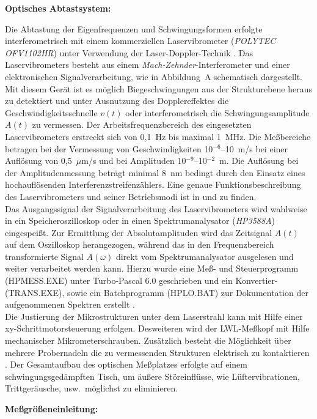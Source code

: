 {\bf Optisches Abtastsystem:}

Die Abtastung der Eigenfrequenzen und Schwingungsformen erfolgte
interferometrisch mit einem kommerziellen Laservibrometer
({\em POLYTEC OFV1102HR}) unter Verwendung der Laser-Doppler-Technik
\cite{Pol91}. Das Laservibrometers besteht aus einem
{\em Mach-Zehnder}-Interferometer und einer elektronischen
Signalverarbeitung, wie in Abbildung~A schematisch dargestellt.
Mit diesem Gerät ist es möglich Biegeschwingungen aus der Strukturebene
heraus zu detektiert und unter Ausnutzung des Dopplereffektes die
Geschwindigkeitsschnelle $v(t)$ oder interferometrisch die
Schwingungsamplitude $A(t)$ zu vermessen.
Der Arbeitsfrequenzbereich des eingesetzten Laservibrometers erstreckt
sich von 0,1~Hz bis maximal 1~MHz. Die Meßbereiche betragen bei der
Vermessung von Geschwindigkeiten 10$^{-6}$--10~m/s bei einer Auflösung
von 0,5~$\mu$m/s und bei Amplituden 10$^{-9}$--10$^{-2}$~m. Die Auflösung
bei der Amplitudenmessung beträgt minimal 8~nm bedingt durch den Einsatz
eines hochauflösenden Interferenzstreifenzählers. Eine genaue
Funktionsbeschreibung des Laservibrometers und seiner Betriebsmodi ist in
\cite{Sel88} und \cite{Lew90} zu finden.\\
Das Ausgangssignal der Signalverarbeitung des Laservibrometers wird
wahlweise in ein Speicheroszilloskop oder in einen Spektrumanalysator
({\em HP3588A}) eingespeißt. Zur Ermittlung der Absolutamplituden wird
das Zeitsignal
$A(t)$ auf dem Oszilloskop herangezogen, während das in den Frequenzbereich
transformierte Signal $A(\omega)$ direkt vom Spektrumanalysator
ausgelesen und weiter verarbeitet werden kann. Hierzu wurde eine
Meß- und Steuerprogramm ({\sf HPMESS.EXE}) unter {\sf Turbo-Pascal 6.0}
geschrieben und ein Konvertier- ({\sf TRANS.EXE}), sowie
ein Batchprogramm ({\sf HPLO.BAT}) zur Dokumentation der aufgenommenen
Spektren erstellt \cite{Mue92}.\\

Die Justierung der Mikrostrukturen unter dem Laserstrahl kann mit Hilfe
einer xy-Schrittmotorsteuerung erfolgen. Desweiteren wird der LWL-Meßkopf
mit Hilfe mechanischer Mikrometerschrauben. Zusätzlich besteht die
Möglichkeit über mehrere Probernadeln die zu vermessenden Strukturen
elektrisch zu kontaktieren \cite{Sch93a}.
Der Gesamtaufbau des optischen Meßplatzes erfolgte auf einem
schwingungsgedämpften Tisch, um äußere Störeinflüsse, wie
Lüftervibrationen, Trittgeräusche, usw.\ möglichst zu eliminieren.


{\bf Meßgrößeneinleitung:}

